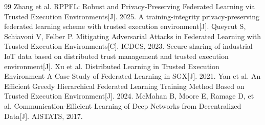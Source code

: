 \documentclass[11pt, a4paper, UTF8, fontset=fandol]{ctexart}
\begin{document}
\begin{thebibliography}{99}
     Zhang et al. RPPFL: Robust and Privacy-Preserving Federated Learning via Trusted Execution Environments[J]. 2025.
     A training-integrity privacy-preserving federated learning scheme with trusted execution environment[J]. 
     Queyrut S, Schiavoni V, Felber P. Mitigating Adversarial Attacks in Federated Learning with Trusted Execution Environments[C]. ICDCS, 2023.
     Secure sharing of industrial IoT data based on distributed trust management and trusted execution environment[J]. 
     Xu et al. Distributed Learning in Trusted Execution Environment A Case Study of Federated Learning in SGX[J]. 2021.
     Yan et al. An Efficient Greedy Hierarchical Federated Learning Training Method Based on Trusted Execution Environment[J]. 2024.
     McMahan B, Moore E, Ramage D, et al. Communication-Efficient Learning of Deep Networks from Decentralized Data[J]. AISTATS, 2017.
    \end{thebibliography}
\end{document}
